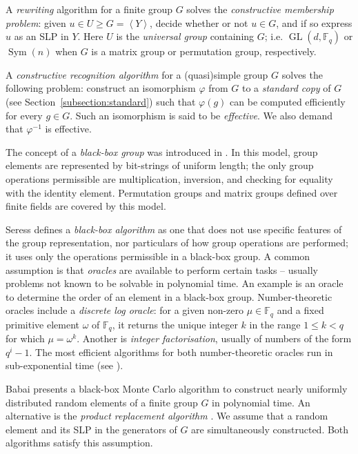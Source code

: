 \documentclass[12pt,twoside,reqno,psamsfonts]{amsproc}
\newcommand{\comment}[1]{\marginpar{\begin{center}\scriptsize{#1}\end{center}}}
\numberwithin{equation}{section}
\numberwithin{figure}{section}
\newcounter{algorithm}
\theoremstyle{plain}
\theoremstyle{definition}
\theoremstyle{remark}
\providecommand{\gen}[1]{\left\langle #1 \right\rangle}
\providecommand{\Sym}[1]{\operatorname{Sym}( #1 )}
\newcommand{\field}[1]{\mathbb{#1}}
\newcommand{\F}{\field{F}}
\DeclareMathOperator{\GL}{GL}
\begin{document}
A \emph{rewriting} algorithm for a finite group $G$ solves the 
{\it constructive membership problem}:
given $u \in U \geqslant G = \gen{Y}$, decide whether or not 
$u \in G$, and if so express $u$ as an SLP in $Y$. 
Here $U$ is the {\it universal group} containing $G$; 
\comment{DFH: small edit}
i.e. $\GL(d, \F_q)$ or $\Sym{n}$ when $G$ is  a matrix group or permutation
group, respectively.

A \emph{constructive recognition algorithm} for a (quasi)simple group $G$ 
solves the following problem: construct an isomorphism $\varphi$ from $G$ to a
\emph{standard copy} of $G$ (see Section~\ref{subsection:standard})
such that $\varphi(g)$ can be computed efficiently for every $g \in G$.
Such an isomorphism is said to be \emph{effective}. 
We also demand that $\varphi^{-1}$ is effective.

The concept of a {\it black-box group} was introduced in
\cite{BabaiSzemeredi84}. In this model,
group elements are represented by bit-strings
of uniform length; the only group operations
permissible are multiplication, inversion, and checking
for equality with the identity element.
Permutation groups
and matrix groups defined over finite fields
are covered by this model.

Seress \cite[p.\ 17]{seress03} defines
a {\it black-box algorithm} as one that does not
use specific features of the group representation,
nor particulars of how group operations
are performed; it uses only the operations
permissible in a black-box group.  A common assumption
is that {\it oracles} are available to perform certain tasks --
usually problems not known to be solvable in polynomial time. 
An example is an oracle to determine the order 
of an element in a black-box group.  Number-theoretic oracles 
include a {\it discrete log oracle}: for a given non-zero
$\mu \in \F_q$ and a fixed primitive element $\omega$ of $\F_q$,
it returns the unique integer $k$ in the
range $1\leqslant k < q$ for which $\mu = \omega^k$.
Another is {\it integer factorisation}, 
usually of numbers of the form $q^i - 1$.
The most efficient algorithms for both number-theoretic oracles 
run in sub-exponential time (see \cite[Chapter 4]{IS}). 

Babai \cite{Babai91} presents a black-box Monte Carlo
algorithm to construct nearly uniformly distributed
random elements of a finite group $G$ in polynomial time.
An alternative is the {\it product replacement algorithm} 
\cite{lg95, Pak00}.  We assume that a random element and its 
SLP in the generators of $G$ are simultaneously constructed.
Both algorithms satisfy this assumption.
\end{document}
